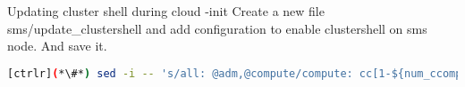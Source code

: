 Updating cluster shell during cloud -init
Create a new file sms/update\_clustershell and add configuration to enable clustershell on sms node. And save it. 


\begin{lstlisting}[language=bash,keywords={}]
[ctrlr](*\#*) sed -i -- 's/all: @adm,@compute/compute: cc[1-${num_ccomputes}]\n&/' /etc/clustershell/groups.d/local.cfg
\end{lstlisting} 

